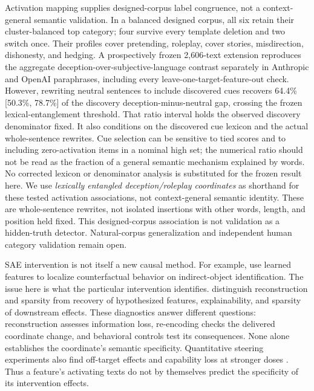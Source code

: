 \documentclass[11pt]{article}
\begin{document}
Activation mapping supplies designed-corpus label congruence, not a
context-general semantic validation. In a
balanced designed corpus, all six retain their cluster-balanced top category;
four survive every template deletion and two switch once. Their profiles
cover pretending, roleplay, cover stories, misdirection, dishonesty, and
hedging. A prospectively frozen 2,606-text extension reproduces the aggregate
deception-over-subjective-language contrast separately in Anthropic and
OpenAI paraphrases, including every leave-one-target-feature-out check.
However, rewriting neutral sentences to include discovered cues recovers 64.4\%
[50.3\%, 78.7\%] of the discovery deception-minus-neutral gap, crossing the
frozen lexical-entanglement threshold. That ratio interval holds the observed
discovery denominator fixed. It also conditions on the discovered cue
lexicon and the actual whole-sentence rewrites. Cue selection can be sensitive
to tied scores and to including zero-activation items in a nominal high set;
the numerical ratio should not be read as the fraction of a general semantic
mechanism explained by words. No corrected lexicon or denominator analysis
is substituted for the frozen result here. We use
\emph{lexically entangled deception/roleplay coordinates} as shorthand for
these tested activation associations, not context-general semantic identity.
These are whole-sentence rewrites, not isolated insertions with other words,
length, and position held fixed. This designed-corpus association is not
validation as a hidden-truth detector.
Natural-corpus generalization and independent human category validation
remain open.

SAE intervention is not itself a new causal method. For example,
\citet{cunningham2023sparse} use learned features to localize counterfactual
behavior on indirect-object identification. The issue here is what the
particular intervention identifies. \citet{gao2024scaling} distinguish
reconstruction and sparsity from recovery of hypothesized features,
explainability, and sparsity of downstream effects. These diagnostics answer
different questions: reconstruction assesses information loss, re-encoding
checks the delivered coordinate change, and behavioral controls test its
consequences. None alone establishes the coordinate's semantic specificity.
Quantitative steering experiments also find off-target effects and
capability loss at stronger doses \citep{durmus2024steering}. Thus a feature's
activating texts do not by themselves predict the specificity of its
intervention effects.
\end{document}
